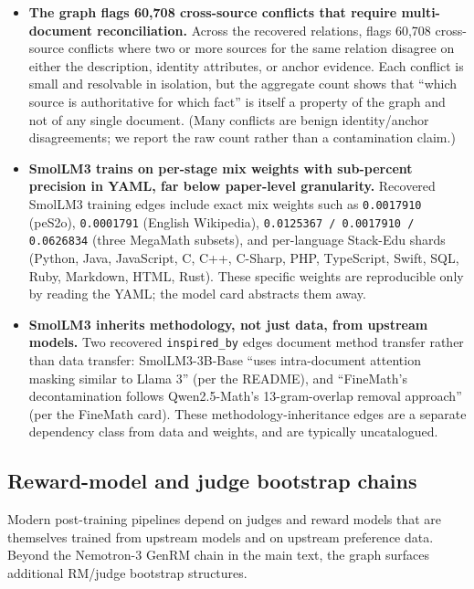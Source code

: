 \begin{itemize}
    \item \textbf{The graph flags 60{,}708 cross-source conflicts that require multi-document reconciliation.}
    Across the recovered relations, \system{} flags 60{,}708 cross-source conflicts where two or more sources for the same relation disagree on either the description, identity attributes, or anchor evidence. Each conflict is small and resolvable in isolation, but the aggregate count shows that ``which source is authoritative for which fact'' is itself a property of the graph and not of any single document. (Many conflicts are benign identity/anchor disagreements; we report the raw count rather than a contamination claim.)

    \item \textbf{SmolLM3 trains on per-stage mix weights with sub-percent precision in YAML, far below paper-level granularity.}
    Recovered SmolLM3 training edges include exact mix weights such as \texttt{0.0017910} (peS2o), \texttt{0.0001791} (English Wikipedia), \texttt{0.0125367 / 0.0017910 / 0.0626834} (three MegaMath subsets), and per-language Stack-Edu shards (Python, Java, JavaScript, C, C++, C-Sharp, PHP, TypeScript, Swift, SQL, Ruby, Markdown, HTML, Rust). These specific weights are reproducible only by reading the YAML; the model card abstracts them away.

    \item \textbf{SmolLM3 inherits methodology, not just data, from upstream models.}
    Two recovered \texttt{inspired\_by} edges document method transfer rather than data transfer: SmolLM3-3B-Base ``uses intra-document attention masking similar to Llama 3'' (per the README), and ``FineMath's decontamination follows Qwen2.5-Math's 13-gram-overlap removal approach'' (per the FineMath card). These methodology-inheritance edges are a separate dependency class from data and weights, and are typically uncatalogued.
\end{itemize}

\subsection{Reward-model and judge bootstrap chains}

Modern post-training pipelines depend on judges and reward models that are themselves trained from upstream models and on upstream preference data. Beyond the Nemotron-3 GenRM chain in the main text, the graph surfaces additional RM/judge bootstrap structures.

